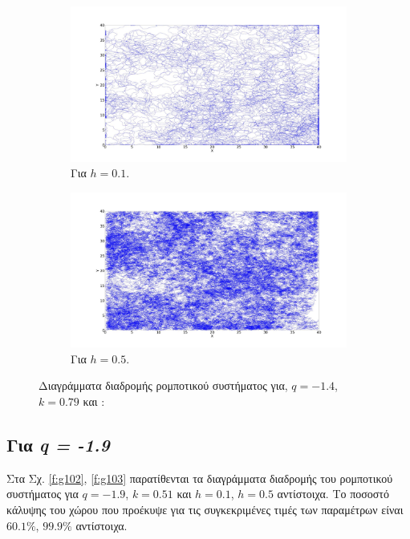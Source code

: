\begin{figure}[ht]
	\centering
	\begin{subfigure}[b]{0.55\textwidth}
		\centering
		\includegraphics[width=\textwidth]{LateX images/log/h/g1-1.4}
		\caption{Για $h =0.1$.}
		\label{f:g100}
	\end{subfigure}
	\hfill
	\begin{subfigure}[b]{0.55\textwidth}
		\centering
		\includegraphics[width=\textwidth]{LateX images/log/h/g2-1.4}
		\caption{Για $h =0.5$.}
		\label{f:g101}
	\end{subfigure}
	\hfill
\caption{Διαγράμματα διαδρομής ρομποτικού συστήματος για, $q = -1.4$, $k = 0.79$ και :}
\end{figure}

\clearpage
\subsection{Για \emph{q = -1.9}}

Στα Σχ. \ref{f:g102}, \ref{f:g103} παρατίθενται τα διαγράμματα διαδρομής του ρομποτικού συστήματος για $q = -1.9$, $k = 0.51$ και $h =0.1$, $h =0.5$ αντίστοιχα. Tο ποσοστό κάλυψης του χώρου που προέκυψε για τις συγκεκριμένες τιμές των παραμέτρων είναι $60.1\%$, $99.9\%$ αντίστοιχα.


